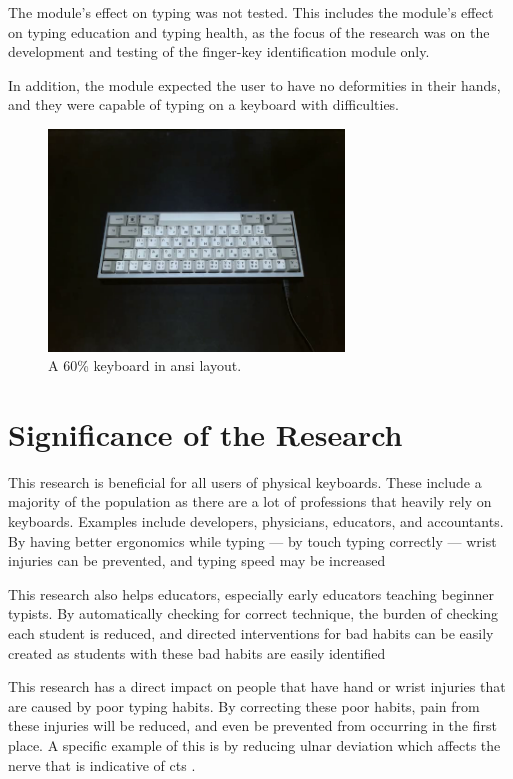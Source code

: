 \documentclass{report}
\begin{document}
The module's effect on typing was not tested. This includes the module's effect
on typing education and typing health, as the focus of the research was on the
development and testing of the finger-key identification module only.

In addition, the module expected the user to have no deformities in their hands,
and they were capable of typing on a keyboard with difficulties.

\begin{figure}[H]
	\centering
	\includegraphics[width=0.7\textwidth]{60.png}
	\caption{A 60\% keyboard in \ac{ansi} layout.}
	\label{fig:60}
	\centering
\end{figure}


\section{Significance of the Research}
This research is beneficial for all users of physical keyboards. These include a
majority of the population as there are a lot of professions that heavily rely
on keyboards. Examples include developers, physicians, educators, and
accountants. By having better ergonomics while typing --- by touch typing
correctly --- wrist injuries can be prevented, and typing speed may be increased

This research also helps educators, especially early educators teaching beginner
typists. By automatically checking for correct technique, the burden of checking
each student is reduced, and directed interventions for bad habits can be
easily created as students with these bad habits are easily identified

This research has a direct impact on people that have hand or wrist injuries
that are caused by poor typing habits. By correcting these poor habits, pain
from these injuries will be reduced, and even be prevented from occurring in the
first place. A specific example of this is by reducing ulnar deviation which
affects the nerve that is indicative of \ac{cts} \parencite{toosi2015}.
\end{document}
